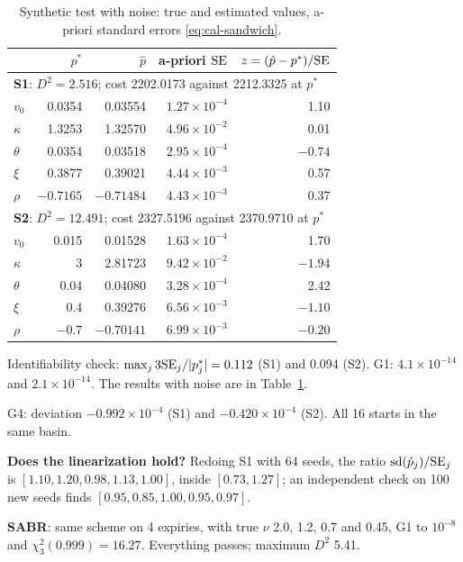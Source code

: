\begin{table}[htbp]
\centering
\small
\caption{Synthetic test with noise: true and estimated values, a-priori standard errors \eqref{eq:cal-sandwich}.}
\label{tab:cal-sint}
\begin{tabular*}{\textwidth}{@{\extracolsep{\fill}}lrrrr@{}}
\toprule
& $p^*$ & $\hat p$ & a-priori $\mathrm{SE}$ & $z=(\hat p-p^*)/\mathrm{SE}$\\
\midrule
\multicolumn{5}{l}{\textbf{S1}: $D^2=2.516$; cost 2202.0173 against 2212.3325 at $p^*$}\\
$v_0$ & 0.0354 & 0.03554 & $1.27\times10^{-4}$ & 1.10\\
$\kappa$ & 1.3253 & 1.32570 & $4.96\times10^{-2}$ & 0.01\\
$\theta$ & 0.0354 & 0.03518 & $2.95\times10^{-4}$ & $-0.74$\\
$\xi$ & 0.3877 & 0.39021 & $4.44\times10^{-3}$ & 0.57\\
$\rho$ & $-0.7165$ & $-0.71484$ & $4.43\times10^{-3}$ & 0.37\\
\midrule
\multicolumn{5}{l}{\textbf{S2}: $D^2=12.491$; cost 2327.5196 against 2370.9710 at $p^*$}\\
$v_0$ & 0.015 & 0.01528 & $1.63\times10^{-4}$ & 1.70\\
$\kappa$ & 3 & 2.81723 & $9.42\times10^{-2}$ & $-1.94$\\
$\theta$ & 0.04 & 0.04080 & $3.28\times10^{-4}$ & 2.42\\
$\xi$ & 0.4 & 0.39276 & $6.56\times10^{-3}$ & $-1.10$\\
$\rho$ & $-0.7$ & $-0.70141$ & $6.99\times10^{-3}$ & $-0.20$\\
\bottomrule
\end{tabular*}
\end{table}

\begin{progetto}[title={In the qpricer project: the round trip}]
Identifiability check: $\max_j3\mathrm{SE}_j/|p^*_j|=0.112$ (S1) and $0.094$ (S2). G1: $4.1\times10^{-14}$ and
$2.1\times10^{-14}$. The results with noise are in Table~\ref{tab:cal-sint}.

\smallskip
G4: deviation $-0.992\times10^{-4}$ (S1) and $-0.420\times10^{-4}$ (S2). All 16 starts in the same basin.

\smallskip
\textbf{Does the linearization hold?} Redoing S1 with 64 seeds, the ratio $\mathrm{sd}(\hat p_j)/\mathrm{SE}_j$ is
$[1.10,1.20,0.98,1.13,1.00]$, inside $[0.73,1.27]$; an independent check on 100 new seeds finds
$[0.95,0.85,1.00,0.95,0.97]$.

\smallskip
\textbf{SABR}: same scheme on 4 expiries, with true $\nu$ 2.0, 1.2, 0.7 and 0.45, G1 to $10^{-8}$ and
$\chi^2_3(0.999)=16.27$. Everything passes; maximum $D^2$ 5.41.
\end{progetto}

